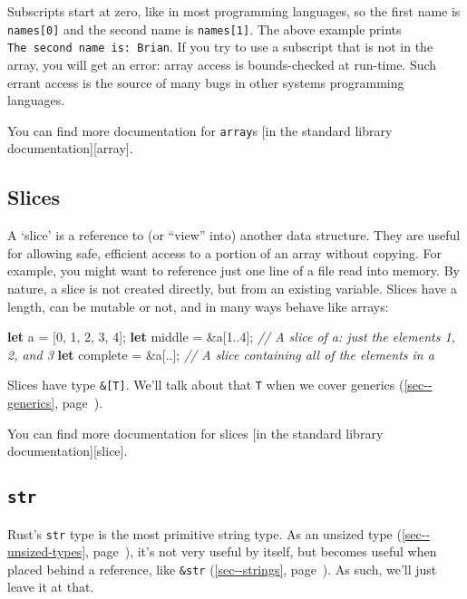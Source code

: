 \documentclass[a4paper,]{book}
\renewcommand*{\hyperref}[2][\ar]{%
  \def\ar{#2}%
  #2 (\autoref{#1}, page~\pageref{#1})}
\newenvironment{Shaded}{\begin{snugshade}}{\end{snugshade}}
\newcommand{\KeywordTok}[1]{\textcolor[rgb]{0.13,0.29,0.53}{\textbf{{#1}}}}
\newcommand{\DecValTok}[1]{\textcolor[rgb]{0.00,0.00,0.81}{{#1}}}
\newcommand{\CommentTok}[1]{\textcolor[rgb]{0.56,0.35,0.01}{\textit{{#1}}}}
\newcommand{\NormalTok}[1]{{#1}}
\begin{document}
Subscripts start at zero, like in most programming languages, so the
first name is \texttt{names{[}0{]}} and the second name is
\texttt{names{[}1{]}}. The above example prints
\texttt{The\ second\ name\ is:\ Brian}. If you try to use a subscript
that is not in the array, you will get an error: array access is
bounds-checked at run-time. Such errant access is the source of many
bugs in other systems programming languages.

You can find more documentation for \texttt{array}s {[}in the standard
library documentation{]}{[}array{]}.

\subsection{Slices}\label{slices}

A `slice' is a reference to (or ``view'' into) another data structure.
They are useful for allowing safe, efficient access to a portion of an
array without copying. For example, you might want to reference just one
line of a file read into memory. By nature, a slice is not created
directly, but from an existing variable. Slices have a length, can be
mutable or not, and in many ways behave like arrays:

\begin{Shaded}
\begin{Highlighting}[]
\KeywordTok{let} \NormalTok{a = [}\DecValTok{0}\NormalTok{, }\DecValTok{1}\NormalTok{, }\DecValTok{2}\NormalTok{, }\DecValTok{3}\NormalTok{, }\DecValTok{4}\NormalTok{];}
\KeywordTok{let} \NormalTok{middle = &a[}\DecValTok{1.}\NormalTok{.}\DecValTok{4}\NormalTok{]; }\CommentTok{// A slice of a: just the elements 1, 2, and 3}
\KeywordTok{let} \NormalTok{complete = &a[..]; }\CommentTok{// A slice containing all of the elements in a}
\end{Highlighting}
\end{Shaded}

Slices have type \texttt{\&{[}T{]}}. We'll talk about that \texttt{T}
when we cover \hyperref[sec--generics]{generics}.

You can find more documentation for slices {[}in the standard library
documentation{]}{[}slice{]}.

\subsection{\texorpdfstring{\texttt{str}}{str}}\label{str}

Rust's \texttt{str} type is the most primitive string type. As an
\hyperref[sec--unsized-types]{unsized type}, it's not very useful by
itself, but becomes useful when placed behind a reference, like
\hyperref[sec--strings]{\texttt{\&str}}. As such, we'll just leave it at
that.
\end{document}
